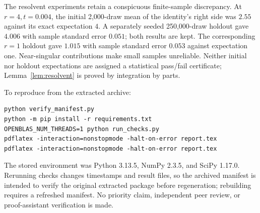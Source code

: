 \documentclass[11pt]{article}
\theoremstyle{definition}
\begin{document}
The resolvent experiments retain a conspicuous finite-sample discrepancy. At $r=4,t=0.004$, the initial 2,000-draw mean of the identity's right side was $2.55$ against its exact expectation $4$. A separately seeded 250,000-draw holdout gave $4.006$ with sample standard error $0.051$; both results are kept. The corresponding $r=1$ holdout gave $1.015$ with sample standard error $0.053$ against expectation one. Near-singular contributions make small samples unreliable. Neither initial nor holdout expectations are assigned a statistical pass/fail certificate; Lemma~\ref{lem:resolvent} is proved by integration by parts.


To reproduce from the extracted archive:
\begin{verbatim}
python verify_manifest.py
python -m pip install -r requirements.txt
OPENBLAS_NUM_THREADS=1 python run_checks.py
pdflatex -interaction=nonstopmode -halt-on-error report.tex
pdflatex -interaction=nonstopmode -halt-on-error report.tex
\end{verbatim}
The stored environment was Python 3.13.5, NumPy 2.3.5, and SciPy 1.17.0. Rerunning checks changes timestamps and result files, so the archived manifest is intended to verify the original extracted package before regeneration; rebuilding requires a refreshed manifest. No priority claim, independent peer review, or proof-assistant verification is made.

\appendix
\end{document}
